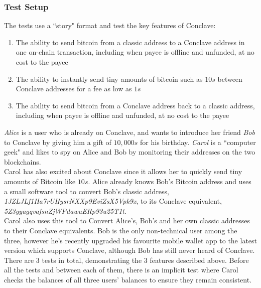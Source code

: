 \documentclass{report}
\begin{document}
			\subsubsection{Test Setup}
			The tests use a ``story" format and test the key features of Conclave:
			\begin{enumerate}
				\item The ability to send bitcoin from a classic address to a Conclave address in one on-chain transaction, including when payee is offline and unfunded, at no cost to the payee
				\item The ability to instantly send tiny amounts of bitcoin such as $10s$ between Conclave addresses for a fee as low as $1s$
				\item The ability to send bitcoin from a Conclave address back to a classic address, including when payee is offline and unfunded, at no cost to the payee
			\end{enumerate}
			\textit{Alice} is a user who is already on Conclave, and wants to introduce her friend \textit{Bob} to Conclave by giving him a gift of $10,000s$ for his birthday. \textit{Carol} is a ``computer geek" and likes to spy on Alice and Bob by monitoring their addresses on the two blockchains. \\
			
			Carol has also excited about Conclave since it allows her to quickly send tiny amounts of Bitcoin like $10s$. Alice already knows Bob's Bitcoin address and uses a small software tool to convert Bob's classic address, \textit{1JZLJLf1Ha7rUHysrNXXp9EviZsX5Vpk9x}, to its Conclave equivalent, \textit{5Z3gyagqvafsnZjWPdawuERp93u25T1t}. \\
			
			Carol also uses this tool to Convert Alice's, Bob's and her own classic addresses to their Conclave equivalents. Bob is the only non-technical user among the three, however he's recently upgraded his favourite mobile wallet app to the latest version which supports Conclave, although Bob has still never heard of Conclave. \\
			
			There are 3 tests in total, demonstrating the 3 features described above. Before all the tests and between each of them, there is an implicit test where Carol checks the balances of all three users' balances to ensure they remain consistent.
			
			
			
\end{document}

